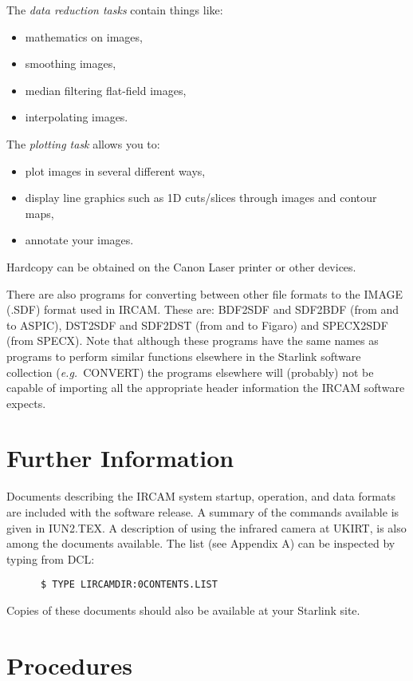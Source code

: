 The {\em data reduction tasks} contain things like:
\begin{itemize}
\item mathematics on images,
\item smoothing images,
\item median filtering flat-field images,
\item interpolating images.
\end{itemize}
The {\em plotting task} allows you to:
\begin{itemize}
\item plot images in several different ways,
\item display line graphics such as 1D cuts/slices through images and contour
maps,
\item annotate your images.
\end{itemize}
Hardcopy can be obtained on the Canon Laser printer or other devices. 

There are also programs for converting between other file formats to the
IMAGE (.SDF) format used in IRCAM. These are: BDF2SDF and SDF2BDF (from
and to ASPIC), DST2SDF and SDF2DST (from and to Figaro) and SPECX2SDF
(from SPECX). Note that although these programs have the same names as
programs to perform similar functions elsewhere in the Starlink software
collection ({\it e.g.}\ CONVERT) the programs elsewhere will (probably)
not be capable of importing all the appropriate header information the
IRCAM software expects. 

\section {Further Information}

Documents describing the IRCAM system startup, operation, and data
formats are included with the software release. A summary of the
commands available is given in IUN2.TEX. A description of using the
infrared  camera at UKIRT, is also among the documents available. The
list (see Appendix A) can be inspected by typing from DCL: 
\begin{verbatim}
      $ TYPE LIRCAMDIR:0CONTENTS.LIST
\end{verbatim}
Copies of these documents should also be available at your Starlink site.

\section {Procedures}

